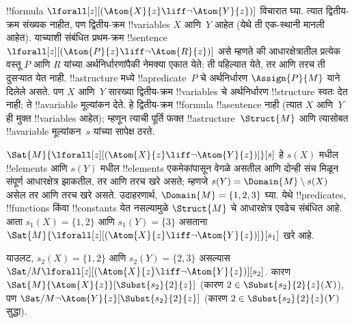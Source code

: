 \documentclass[../../../include/open-logic-section]{subfiles}
\begin{document}
\begin{ex}
  !!{formula}
  $\lforall[z][(\Atom{X}{z} \liff \lnot
    \Atom{Y}{z})]$
  विचारात घ्या.
  त्यात द्वितीय-क्रम
  संख्यक नाहीत,
  पण द्वितीय-क्रम
  !!{variable}s
  $X$ आणि~$Y$
  आहेत (येथे ती
  एक-स्थानी मानली
  आहेत).
  याच्याशी संबंधित
  प्रथम-क्रम
  !!{sentence}
  $\lforall[z][(\Atom{P}{z} \liff \lnot \Atom{R}{z})]$
  असे म्हणते की
  आधारक्षेत्रातील प्रत्येक वस्तू
  $P$ आणि $R$ यांच्या
  अर्थनिर्धारणांपैकी नेमक्या एकात येते:
  ती पहिल्यात येते, तर आणि तरच
  ती दुसऱ्यात येत नाही.
  !!a{structure}
  मध्ये
  !!a{predicate}~$P$
  चे अर्थनिर्धारण
  $\Assign{P}{M}$
  याने दिलेले
  असते. पण
  $X$ आणि~$Y$
  सारख्या द्वितीय-क्रम
  !!{variable}s
  चे अर्थनिर्धारण
  !!{structure}
  स्वतः देत नाही;
  ते !!a{variable}
  मूल्यांकन देते.
  हे द्वितीय-क्रम
  !!{formula}
  !!a{sentence}
  नाही (त्यात
  $X$ आणि~$Y$
  ही मुक्त
  !!{variable}s
  आहेत);
  म्हणून त्याची
  पूर्ति फक्त
  !!a{structure}~$\Struct{M}$
  आणि त्यासोबत
  !!a{variable}
  मूल्यांकन~$s$
  यांच्या सापेक्ष
  ठरते.

  $\Sat{M}{\lforall[z][(\Atom{X}{z} \liff \lnot \Atom{Y}{z})]}[s]$
  हे $s(X)$ मधील
  !!{element}s आणि $s(Y)$ मधील
  !!{element}s एकमेकांपासून वेगळे असतील
  आणि दोन्ही संच मिळून संपूर्ण आधारक्षेत्र झाकतील,
  तर आणि तरच खरे असते; म्हणजे
  $s(Y) = \Domain{M} \setminus s(X)$
  असेल तर आणि
  तरच खरे असते.
  उदाहरणार्थ,
  $\Domain{M} = \{1, 2, 3\}$
  घ्या.
  येथे !!{predicate}s,
  !!{function}s
  किंवा !!{constant}s
  येत नसल्यामुळे
  $\Struct{M}$
  चे आधारक्षेत्र
  एवढेच संबंधित
  आहे.
  आता
  $s_1(X) = \{1, 2\}$
  आणि
  $s_1(Y) = \{3\}$
  असताना
  $\Sat{M}{\lforall[z][(\Atom{X}{z}
      \liff \lnot \Atom{Y}{z})]}[s_1]$
  खरे आहे.

  याउलट,
  $s_2(X) = \{1, 2\}$
  आणि
  $s_2(Y) = \{2, 3\}$
  असल्यास
  $\Sat/{M}{\lforall[z][(\Atom{X}{z} \liff \lnot
      \Atom{Y}{z})]}[s_2]$.
  कारण
  $\Sat{M}{\Atom{X}{z}}[\Subst{s_2}{2}{z}]$
  (कारण
  $2 \in \Subst{s_2}{2}{z}(X)$),
  पण
  $\Sat/{M}{\lnot \Atom{Y}{z}}[\Subst{s_2}{2}{z}]$
  (कारण
  $2 \in
  \Subst{s_2}{2}{z}(Y)$
  सुद्धा).
\end{ex}
\end{document}
